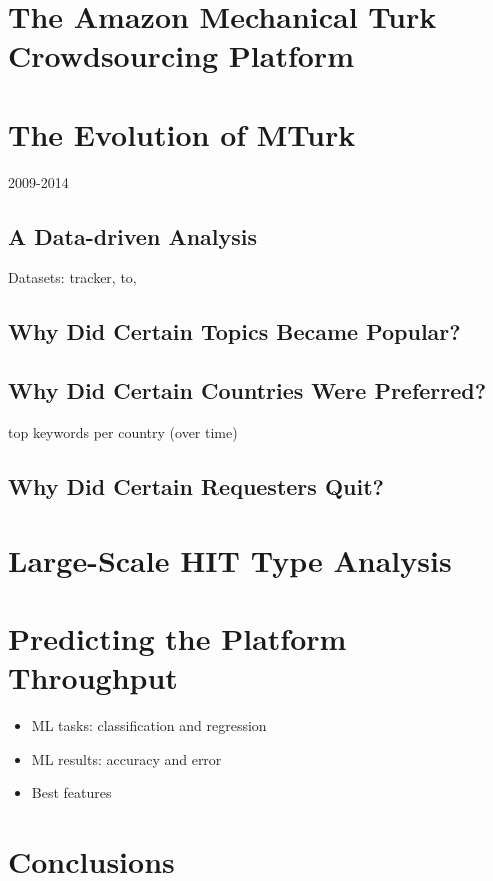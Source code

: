 \documentclass{sig-alternate}
\begin{document}





\section{The Amazon Mechanical Turk Crowdsourcing Platform}

\section{The Evolution of MTurk}
2009-2014
\subsection{A Data-driven Analysis}
Datasets: tracker, to, 
\subsection{Why Did Certain Topics Became Popular?}
\subsection{Why Did Certain Countries Were Preferred?}
top keywords per country (over time)
\subsection{Why Did Certain Requesters Quit?}

\section{Large-Scale HIT Type Analysis}



\section{Predicting the Platform Throughput}
\begin{itemize}

	\item ML tasks: classification and regression

	\item ML results: accuracy and error

	\item Best features

\end{itemize}

\section{Conclusions}
\end{document}

